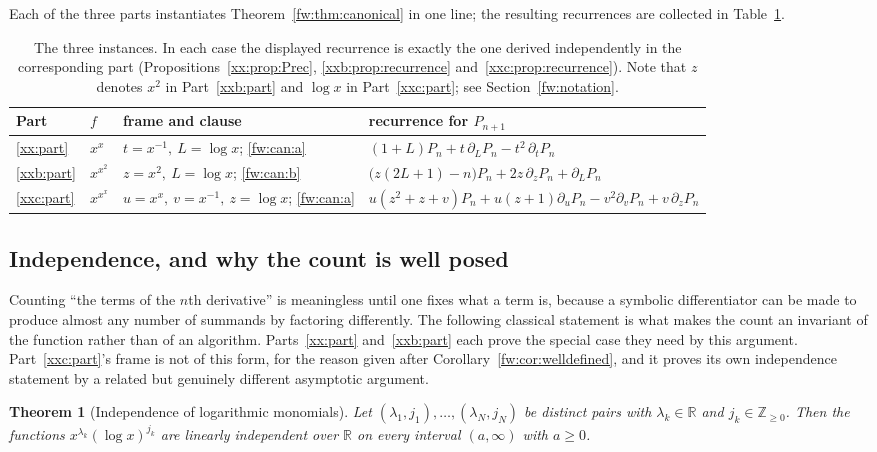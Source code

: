 \documentclass[11pt,a4paper]{article}
\numberwithin{equation}{section}
\newtheorem{theorem}{Theorem}[section]
\theoremstyle{definition}
\theoremstyle{remark}
\theoremstyle{plain}
\newcommand{\Z}{\mathbb Z}
\newcommand{\R}{\mathbb R}
\begin{document}
Each of the three parts instantiates Theorem~\ref{fw:thm:canonical} in one line;
the resulting recurrences are collected in Table~\ref{fw:tab:instances}.

\begin{table}[htbp]
\centering
\small
\begin{tabular}{@{}llll@{}}
\toprule
Part & $f$ & frame and clause & recurrence for $P_{n+1}$\\
\midrule
\ref{xx:part} & $x^{x}$ &
 $t=x^{-1},\ L=\log x$; \ref{fw:can:a} &
 $(1+L)P_n+t\,\partial_LP_n-t^2\,\partial_tP_n$\\[2pt]
\ref{xxb:part} & $x^{x^2}$ &
 $z=x^2,\ L=\log x$; \ref{fw:can:b} &
 $\bigl(z(2L+1)-n\bigr)P_n+2z\,\partial_zP_n+\partial_LP_n$\\[2pt]
\ref{xxc:part} & $x^{x^x}$ &
 $u=x^x,\ v=x^{-1},\ z=\log x$; \ref{fw:can:a} &
 $u(z^2{+}z{+}v)P_n+u(z{+}1)\partial_uP_n-v^2\partial_vP_n+v\,\partial_zP_n$\\
\bottomrule
\end{tabular}
\caption{The three instances.  In each case the displayed recurrence is exactly
the one derived independently in the corresponding part
(Propositions~\ref{xx:prop:Prec}, \ref{xxb:prop:recurrence}
and~\ref{xxc:prop:recurrence}).  Note that $z$ denotes $x^2$ in
Part~\ref{xxb:part} and $\log x$ in Part~\ref{xxc:part}; see
Section~\ref{fw:notation}.}
\label{fw:tab:instances}
\end{table}

\subsection{Independence, and why the count is well posed}\label{fw:independence}

Counting ``the terms of the $n$th derivative'' is meaningless until one fixes
what a term is, because a symbolic differentiator can be made to produce almost
any number of summands by factoring differently.  The following classical
statement is what makes the count an invariant of the function rather than of an
algorithm.  Parts~\ref{xx:part} and~\ref{xxb:part} each prove the special case
they need by this argument.  Part~\ref{xxc:part}'s frame is not of this form,
for the reason given after Corollary~\ref{fw:cor:welldefined}, and it proves its
own independence statement by a related but genuinely different asymptotic
argument.

\begin{theorem}[Independence of logarithmic monomials]\label{fw:thm:independence}
Let $(\lambda_1,j_1),\dots,(\lambda_N,j_N)$ be distinct pairs with
$\lambda_k\in\R$ and $j_k\in\Z_{\ge0}$.  Then the functions
$x^{\lambda_k}(\log x)^{j_k}$ are linearly independent over $\R$ on every
interval $(a,\infty)$ with $a\ge0$.
\end{theorem}
\end{document}
